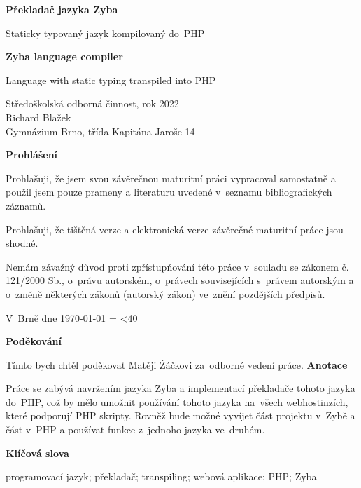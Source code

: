 \documentclass[a4paper,12pt]{article}
\author{Richard Blažek}
\makeatletter
\newcommand{\repeatchar}[2]{
  \begingroup
  \my@repeat@count=\z@
  \@whilenum\my@repeat@count<#1\do{#2\advance\my@repeat@count\@ne}
  \endgroup
}
\makeatother
\begin{document}
\begin{titlepage}
    \begin{center}

	\vspace*{3.5cm}            
	\Huge
	\textbf{Překladač jazyka Zyba}
            
	\vspace{0.5cm}
	\LARGE
	Staticky typovaný jazyk kompilovaný do~PHP
        
	\vspace*{1.5cm}
	\Huge
	\textbf{Zyba language compiler}
            
	\vspace{0.5cm}
	\LARGE
	Language with static typing transpiled into PHP
            
	\vfill
            
	\large
        Středoškolská odborná činnost, rok 2022\\
	Richard Blažek\\
	Gymnázium Brno, třída Kapitána Jaroše 14
    \end{center}
\end{titlepage}
\thispagestyle{empty}
\Large\textbf{Prohlášení}\normalsize

Prohlašuji, že jsem svou závěrečnou maturitní práci vypracoval samostatně a použil jsem pouze prameny a literaturu uvedené v~seznamu bibliografických záznamů.

Prohlašuji, že tištěná verze a elektronická verze závěrečné maturitní práce jsou shodné.

Nemám závažný důvod proti zpřístupňování této práce v~souladu se zákonem č. 121/2000 Sb., o~právu autorském, o~právech souvisejících s~právem autorským a o~změně některých zákonů (autorský zákon) ve~znění pozdějších předpisů. 

V~Brně dne \today{} \repeatchar{40}{.}
\newpage
\thispagestyle{empty}
\Large\textbf{Poděkování}\normalsize

Tímto bych chtěl poděkovat Matěji Žáčkovi za~odborné vedení práce.
\newpage
\thispagestyle{empty}
\Large\textbf{Anotace}\normalsize

Práce se zabývá navržením jazyka Zyba a implementací překladače tohoto jazyka do~PHP, což by mělo umožnit používání tohoto jazyka na~všech webhostinzích, které podporují PHP skripty. Rovněž bude možné vyvíjet část projektu v~Zybě a část v~PHP a používat funkce z~jednoho jazyka ve~druhém.

\Large\textbf{Klíčová slova}\normalsize

programovací jazyk; překladač; transpiling; webová aplikace; PHP; Zyba
\end{document}
